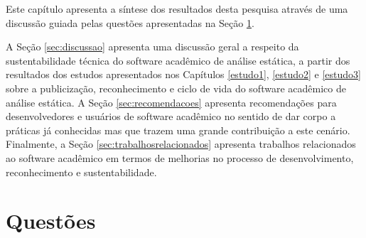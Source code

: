 \label{discussao}

Este capítulo apresenta 
a síntese dos resultados desta pesquisa através de uma
discussão guiada pelas questões apresentadas na Seção \ref{discussao:questoes}.

A Seção \ref{sec:discussao} apresenta 
uma discussão geral a respeito da
sustentabilidade técnica do software acadêmico de análise estática,
a partir dos resultados dos estudos apresentados nos Capítulos \ref{estudo1}, \ref{estudo2} e
\ref{estudo3} sobre a publicização, reconhecimento e ciclo de vida do software
acadêmico de análise estática.
A Seção \ref{sec:recomendacoes} apresenta recomendações para desenvolvedores e usuários de software acadêmico no sentido de dar corpo a práticas já conhecidas mas que trazem uma grande contribuição a este cenário.
Finalmente, a Seção \ref{sec:trabalhosrelacionados} apresenta trabalhos relacionados ao software acadêmico em termos de melhorias no processo de desenvolvimento, reconhecimento e sustentabilidade.

\section{Questões} \label{discussao:questoes}

\newcommand{\QuestaoUm}{
  Como evolui o reconhecimento ao software acadêmico de análise estática
  publicado nas conferências de Engenharia de Software ASE e SCAM?
}
\newcommand{\QuestaoDois}{
  A publicização do software acadêmico de análise estática publicado nas
  conferências de Engenharia de Software ASE e SCAM influencia o seu
  reconhecimento?
}
\newcommand{\QuestaoTres}{
  O ciclo de vida do software acadêmico de análise estática publicado nas
  conferências de Engenharia de Software ASE e SCAM influencia o seu
  reconhecimento?
}
\newcommand{\QuestaoQuatro}{
  Qual o tamanho do software acadêmico de análise estática publicado nas
  conferências de Engenharia de Software ASE e SCAM?
}
\newcommand{\QuestaoCinco}{
  Como evolui o tamanho do software acadêmico de análise estática publicado nas
  conferências de Engenharia de Software ASE e SCAM?
}
\newcommand{\QuestaoSeis}{
  É possível replicar ou reproduzir pesquisas que mencionam software
  acadêmico de análise estática publicado nas conferências de Engenharia de
  Software ASE e SCAM?
}
\newcommand{\QuestaoSete}{
  O software acadêmico de análise estática publicado nas conferências de
  Engenharia de Software ASE e SCAM é sustentável tecnicamente?
}
\newcommand{\QuestaoOito}{
  O software acadêmico de análise estática publicado nas conferências de
  Engenharia de Software ASE e SCAM é útil e maduro suficiente para ser
  utilizado em outras pesquisas?
}

